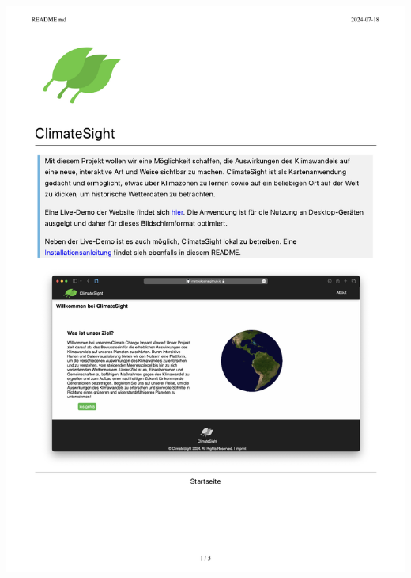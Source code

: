\documentclass[12pt]{article}
\begin{document}
\includegraphics[width=\textwidth, page=3]{Planungsdokumente/graphics/README.pdf}
\end{document}
